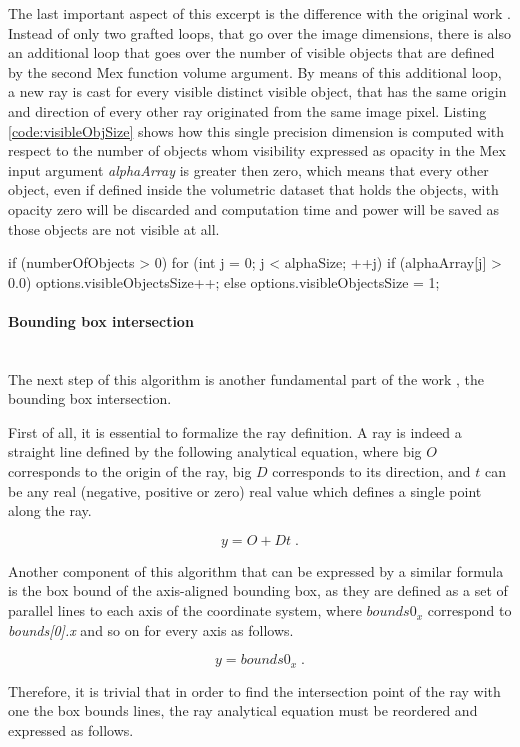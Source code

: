 \documentclass[12pt,a4paper]{extarticle}
\newcommand{\myparagraph}[1]{\paragraph{#1}\mbox{}\\}
\begin{document}
The last important aspect of this excerpt is the difference with the original work \cite{levoy_1990:5}. Instead of only two grafted loops, that go over the image dimensions, there is also an additional loop that goes over the number of visible objects that are defined by the second Mex function volume argument. By means of this additional loop, a new ray is cast for every visible distinct visible object, that has the same origin and direction of every other ray originated from the same image pixel. Listing \ref{code:visibleObjSize} shows how this single precision dimension is computed with respect to the number of objects whom visibility expressed as opacity in the Mex input argument \textit{alphaArray} is greater then zero, which means that every other object, even if defined inside the volumetric dataset that holds the objects, with opacity zero will be discarded and computation time and power will be saved as those objects are not visible at all.
\begin{cpp}[caption={Computation of the number of visible objects concerning the defined elements of the alphaArray with opacity greater than zero},label=code:visibleObjSize]
if (numberOfObjects > 0) {
	for (int j = 0; j < alphaSize; ++j) {
		if (alphaArray[j] > 0.0) {
			options.visibleObjectsSize++;
		}
	}
} else {
	options.visibleObjectsSize = 1;
}
\end{cpp}

\myparagraph{Bounding box intersection} The next step of this algorithm is another fundamental part of the work \cite{levoy_1988:4}, the bounding box intersection.

First of all, it is essential to formalize the ray definition. A ray is indeed a straight line defined by the following analytical equation, where big $O$ corresponds to the origin of the ray, big $D$ corresponds to its direction, and $t$ can be any real (negative, positive or zero) real value which defines a single point along the ray.

\[
y = O +Dt \;.
\]

Another component of this algorithm that can be expressed by a similar formula is the box bound of the axis-aligned bounding box,  as they are defined as a set of parallel lines to each axis of the coordinate system, where $bounds0_{x}$ correspond to \textit{bounds[0].x} and so on for every axis as follows.

\[
y = bounds0_{x} \;.
\] 

Therefore, it is trivial that in order to find the intersection point of the ray with one the box bounds lines, the ray analytical equation must be reordered and expressed as follows.
\end{document}
